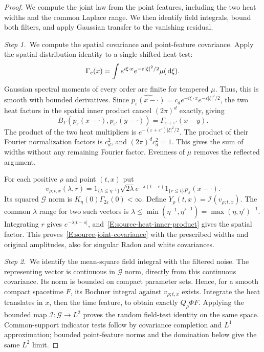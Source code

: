 \begin{proof}
  We compute the joint law from the point features, including the two heat
  widths and the common Laplace range. We then identify field integrals, bound
  both filters, and apply Gaussian transfer to the vanishing residual.

  \medskip
  \noindent\textit{Step 1.~}We compute the spatial covariance and
  point-feature covariance.
  Apply the spatial distribution identity to a single shifted heat test:
  \[
    \Gamma_e(x)=\int e^{i\xi\cdot x}e^{-e|\xi|^2/2}\mu(\,\mathrm{d}\xi).
  \]
  Gaussian spectral moments of every order are finite for tempered $\mu$. Thus,
  this is smooth with bounded derivatives. Since
  $\widehat{p_\varepsilon(x-\cdot)} = c_de^{-i\xi\cdot
  x}e^{-\varepsilon|\xi|^2/2}$, the two heat factors in the spatial inner
  product cancel $(2\pi)^d$ exactly, giving
  \begin{equation}\label{E:source-heat-inner-product}
    B_\Gamma(p_\varepsilon(x-\cdot),p_{\varepsilon'}(y-\cdot))
    =\Gamma_{\varepsilon+\varepsilon'}(x-y).
  \end{equation}
  The product of the two heat multipliers is
  $e^{-(\varepsilon+\varepsilon')|\xi|^2/2}$. The product of their Fourier
  normalization factors is $c_d^2$, and $(2\pi)^dc_d^2 = 1$. This gives the
  sum of widths without any remaining Fourier factor.
  Evenness of $\mu$ removes the reflected argument.

  For each positive $\rho$ and point $(t,x)$ put
  \begin{equation}\label{E:source-point-feature}
    v_{\rho;t,x}(\lambda,r)
    =1_{\{\lambda\le\eta^{-1}\}}\sqrt{2\lambda}
    e^{-\lambda(t-r)}1_{\{r\le t\}}p_\varepsilon(x-\cdot).
  \end{equation}
  Its squared $\mathcal{G}$ norm is $K_\eta(0)\Gamma_{2\varepsilon}(0) <
  \infty$. Define $Y_\rho(t,x) = \mathcal{I}(v_{\rho;t,x})$. The common
  $\lambda$ range for two such vectors is $\lambda \le
  \min(\eta^{-1},\eta'^{-1}) = \max(\eta,\eta')^{-1}$. Integrating $r$ gives
  $e^{-\lambda|t-s|}$, and~\eqref{E:source-heat-inner-product} gives the spatial
  factor. This proves~\eqref{E:source-joint-covariance} with the prescribed
  widths and original amplitudes, also for singular Radon and white covariances.

  \medskip
  \noindent\textit{Step 2.~}We identify the mean-square field integral with
  the filtered noise.
  The representing vector is continuous in $\mathcal{G}$ norm, directly from
  this continuous covariance. Its norm is bounded on compact parameter sets.
  Hence, for a smooth compact spacetime $F$, its Bochner integral against
  $v_{\rho;t,x}$ exists. Integrate the heat translates in $x$, then the time
  feature, to obtain exactly $Q_\rho\Phi F$. Applying the bounded map
  $\mathcal{I}:\mathcal{G} \to L^2$ proves the random field-test identity on the
  same space. Common-support indicator tests follow by covariance completion and
  $L^1$ approximation; bounded point-feature norms and the domination below give
  the same $L^2$ limit.



\end{proof}
